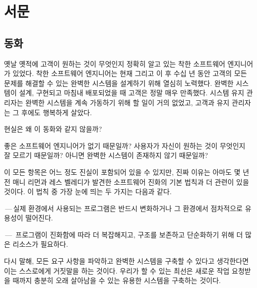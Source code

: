 \documentclass[a4paper,10pt,twoside]{book}
\begin{document}
	\frontmatter
	\sloppy
\fi

\chapter{서문}

\section*{동화}

\begin{center}
\begin{Large}
옛날 옛적에 고객이 원하는 것이 무엇인지 정확히 알고 있는 착한 소프트웨어 엔지니어가 있었다. 착한 소프트웨어 엔지니어는 현재 그리고 이 후 수십 년 동안 고객의 모든 문제를 해결할 수 있는 완벽한 시스템을 설계하기 위해 열심히 노력했다. 완벽한 시스템이 설계, 구현되고 마침내 배포되었을 때 고객은 정말 매우 만족했다. 시스템 유지 관리자는 완벽한 시스템을 계속 가동하기 위해 할 일이 거의 없었고, 고객과 유지 관리자는 그 후에도 행복하게 살았다.
\end{Large}
\end{center}

\noindent
현실은 왜 이 동화와 같지 않을까?

좋은 소프트웨어 엔지니어가 없기 때문일까? 사용자가 자신이 원하는 것이 무엇인지 잘 모르기 때문일까? 아니면 완벽한 시스템이 존재하지 않기 때문일까?

이 모든 항목은 어느 정도 진실이 포함되어 있을 수 있지만, 진짜 이유는 아마도 몇 년 전 매니 리먼과 레스 벨레디가 발견한 소프트웨어 진화의 기본 법칙과 더 관련이 있을 것이다. 이 법칙 중 가장 눈에 띄는 두 가지는 다음과 같다\cite{Lehm85a}.
\begin{bulletlist}
  \item {}\,---\,실제 환경에서 사용되는 프로그램은 반드시 변화하거나 그 환경에서 점차적으로 유용성이 떨어진다.
  \item {}\,---\,
프로그램이 진화함에 따라 더 복잡해지고, 구조를 보존하고 단순화하기 위해 더 많은 리소스가 필요하다.
\end{bulletlist}

다시 말해, 모든 요구 사항을 파악하고 완벽한 시스템을 구축할 수 있다고 생각한다면 이는 스스로에게 거짓말을 하는 것이다. 우리가 할 수 있는 최선은 새로운 작업 요청받을 때까지 충분히 오래 살아남을 수 있는 유용한 시스템을 구축하는 것이다. 
\end{document}
